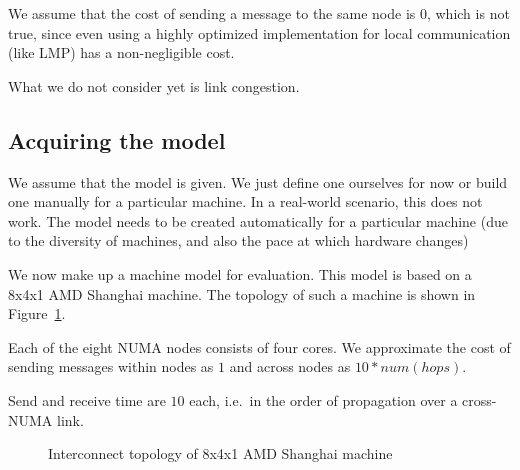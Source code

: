 \documentclass{article}
\begin{document}
We assume that the cost of sending a message to the same node is 0,
which is not true, since even using a highly optimized implementation
for local communication (like LMP) has a non-negligible cost.

What we do not consider yet is link congestion. 

\subsection{Acquiring the model}

We assume that the model is given. We just define one ourselves for
now or build one manually for a particular machine. In a real-world
scenario, this does not work. The model needs to be created
automatically for a particular machine (due to the diversity of
machines, and also the pace at which hardware changes)

We now make up a machine model for evaluation. This model is based on
a 8x4x1 AMD Shanghai machine. The topology of such a machine is shown
in Figure~\ref{fig:gruyere}.

Each of the eight NUMA nodes consists of four cores. We approximate the
cost of sending messages within nodes as $1$ and across nodes as
$10*num(hops)$.

Send and receive time are $10$ each, i.e.\ in the order of propagation
over a cross-NUMA link.

\begin{figure}[htb]
  \centering
  \caption{Interconnect topology of 8x4x1 AMD Shanghai machine}
  \label{fig:gruyere}
\end{figure}
\end{document}
